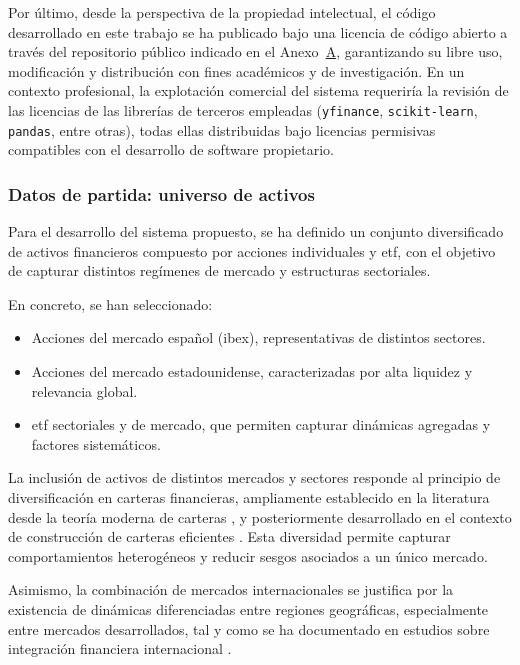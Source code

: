\documentclass[
]{article}
\begin{document}
Por último, desde la perspectiva de la propiedad intelectual, el código desarrollado en este trabajo se ha publicado bajo una licencia de código abierto a través del repositorio público indicado en el Anexo~\hyperlink{anex:codigo}{A}, garantizando su libre uso, modificación y distribución con fines académicos y de investigación. En un contexto profesional, la explotación comercial del sistema requeriría la revisión de las licencias de las librerías de terceros empleadas (\texttt{yfinance}, \texttt{scikit-learn}, \texttt{pandas}, entre otras), todas ellas distribuidas bajo licencias permisivas compatibles con el desarrollo de software propietario.

\subsubsection{Datos de partida: universo de activos}

Para el desarrollo del sistema propuesto, se ha definido un conjunto
diversificado de activos financieros compuesto por acciones individuales
y \gls{etf}, con el objetivo de capturar distintos
regímenes de mercado y estructuras sectoriales.

En concreto, se han seleccionado:

\begin{itemize}
\item Acciones del mercado español (\gls{ibex}), representativas de distintos sectores.
\item Acciones del mercado estadounidense, caracterizadas por alta liquidez y relevancia global.
\item \gls{etf} sectoriales y de mercado, que permiten capturar dinámicas agregadas y factores sistemáticos.
\end{itemize}

La inclusión de activos de distintos mercados y sectores responde al principio de diversificación en carteras financieras, ampliamente establecido en la literatura desde la teoría moderna de carteras \parencite{markowitz1952}, y posteriormente desarrollado en el contexto de construcción de carteras eficientes \parencite{elton1997modern}. Esta diversidad permite capturar comportamientos heterogéneos y reducir sesgos asociados a un único mercado.

Asimismo, la combinación de mercados internacionales se justifica por la existencia de dinámicas diferenciadas entre regiones geográficas, especialmente entre mercados desarrollados, tal y como se ha documentado en estudios sobre integración financiera internacional \parencite{bekaert1995time}.
\end{document}
